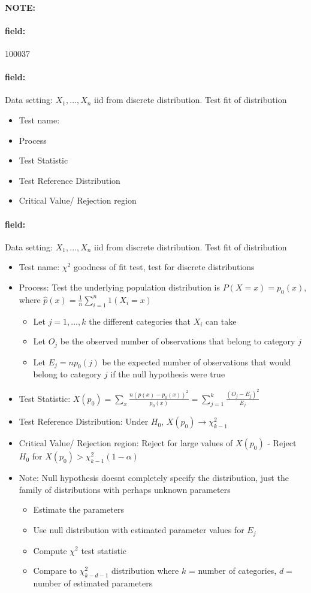 \documentclass[12pt]{article}
\newenvironment{note}{\paragraph{NOTE:}}{}
\newenvironment{field}{\paragraph{field:}}{}
\begin{document}
\begin{note} \begin{field} \tiny 100037 \end{field}
 \begin{field}
  Data setting: $X_1, \ldots , X_n$ iid from discrete distribution. Test fit of distribution
  \begin{itemize}
   \item Test name:
   \item Process
   \item Test Statistic
   \item Test Reference Distribution
   \item Critical Value/ Rejection region
  \end{itemize}
 \end{field}
 \begin{field}
  Data setting: $X_1, \ldots , X_n$ iid from discrete distribution. Test fit of distribution
  \begin{itemize}
   \item Test name: $\chi^2$ goodness of fit test, test for discrete distributions
   \item Process: Test the underlying population distribution is $P(X = x) = p_0(x)$, where $\hat{p}(x) = \frac{1}{n} \sum_{i=1}^n 1(X_i = x)$
         \begin{itemize}
          \item Let $j = 1, \ldots, k$ the different categories that $X_i$ can take
          \item Let $O_j$ be the observed number of observations that belong to category $j$
          \item Let $E_j = np_0(j)$ be the expected number of observations that would belong to category $j$ if the null hypothesis were true
         \end{itemize}
   \item Test Statistic: $X(p_0) = \sum_x\frac{n(\hat{p}(x) - p_0(x))^2}{p_0(x)} = \sum_{j=1}^k \frac{(O_j - E_j)^2}{E_j}$
   \item Test Reference Distribution: Under $H_0$, $X(p_0) \to \chi_{k-1}^2$
   \item Critical Value/ Rejection region: Reject for large values of $X(p_0)$ - Reject $H_0$ for $X(p_0) > \chi_{k-1}^2(1-\alpha)$
   \item Note: Null hypothesis doesnt completely specify the distribution, just the family of distributions with perhaps unknown parameters
         \begin{itemize}
          \item Estimate the parameters
          \item Use null distribution with estimated parameter values for $E_j$
          \item Compute $\chi^2$ test statistic
          \item Compare to $\chi_{k-d-1}^2$ distribution where $k$ = number of categories, $d = $ number of estimated parameters
         \end{itemize}
  \end{itemize}
 \end{field}
\end{note}
\end{document}
